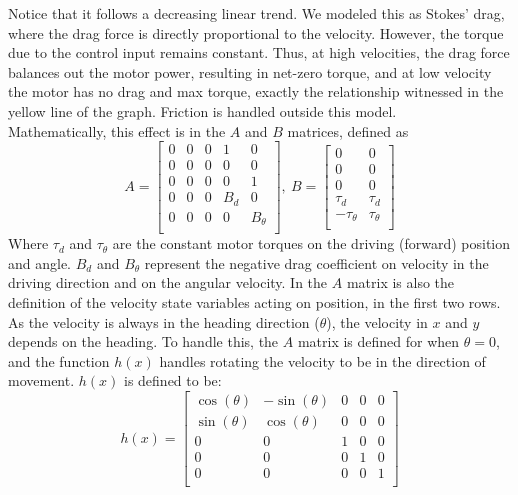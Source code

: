 \documentclass[a4paper,12pt]{article}
\begin{document}
Notice that it follows a decreasing linear trend. We modeled this as Stokes' drag, where the drag force is directly proportional to the velocity. However, the torque due to the control input remains constant. Thus, at high velocities, the drag force balances out the motor power, resulting in net-zero torque, and at low velocity the motor has no drag and max torque, exactly the relationship witnessed in the yellow line of the graph. Friction is handled outside this model. \\

Mathematically, this effect is in the $A$ and $B$ matrices, defined as $$
A = \begin{bmatrix}
	0 & 0 & 0 & 1 & 0\\
	0 & 0 & 0 & 0 & 0\\
	0 & 0 & 0 & 0 & 1\\
	0 & 0 & 0 & B_d & 0\\
	0 & 0 & 0 & 0 & B_\theta\\


\end{bmatrix}, \
B = \begin{bmatrix}
	0 & 0\\
	0 & 0\\
	0 & 0\\
	\tau_d & \tau_d \\
	-\tau_{\theta} & \tau_{\theta}\\
\end{bmatrix}
$$
Where $\tau_d$ and $\tau_\theta$ are the constant motor torques on the driving (forward) position and angle. $B_d$ and $B_\theta$ represent the negative drag coefficient on velocity in the driving direction and on the angular velocity. In the $A$ matrix is also the definition of the velocity state variables acting on position, in the first two rows. As the velocity is always in the heading direction ($\theta$), the velocity in $x$ and $y$ depends on the heading. To handle this, the $A$ matrix is defined for when $\theta = 0$, and the function $h(x)$ handles rotating the velocity to be in the direction of movement. $h(x)$ is defined to be:
$$h(x) = \begin{bmatrix}
	\cos(\theta) & -\sin(\theta) & 0 & 0 & 0\\
	\sin(\theta) & \cos(\theta) & 0 & 0 & 0\\
	0 & 0 & 1 & 0 & 0\\
	0 & 0 & 0 & 1 & 0\\
	0 & 0 & 0 & 0 & 1\\
\end{bmatrix}$$
\end{document}
